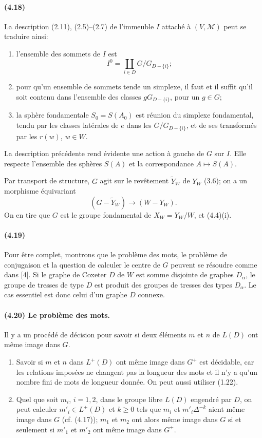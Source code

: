 \documentclass[10pt]{article}
\begin{document}
\paragraph{(4.18)} La description (2.11), (2.5)--(2.7) de l'immeuble \(I\) attaché à \((V,\mathcal M)\) peut se traduire ainsi:
\begin{enumerate}[label=\alph*)]
\item l'ensemble des sommets de \(I\) est
\[
I^0=\coprod_{i\in D}G/G_{D-\{i\}};
\]
\item pour qu'un ensemble de sommets tende un simplexe, il faut et il suffit qu'il soit contenu dans l'ensemble des classes \(gG_{D-\{i\}}\), pour un \(g\in G\);
\item la sphère fondamentale \(S_0=S(A_0)\) est réunion du simplexe fondamental, tendu par les classes latérales de \(e\) dans les \(G/G_{D-\{i\}}\), et de ses transformés par les \(r(w)\), \(w\in W\).
\end{enumerate}
La description précédente rend évidente une action à gauche de \(G\) sur \(I\). Elle respecte l'ensemble des sphères \(S(A)\) et la correspondance \(A\mapsto S(A)\).

Par transport de structure, \(G\) agit sur le revêtement \(\widetilde Y_W\) de \(Y_W\) (3.6); on a un morphisme équivariant
\[
(G-\widetilde Y_W)\longrightarrow (W-Y_W).
\]
On en tire que \(G\) est le groupe fondamental de \(X_W=Y_W/W\), et (4.4)(i).

\paragraph{(4.19)} Pour être complet, montrons que le problème des mots, le problème de conjugaison et la question de calculer le centre de \(G\) peuvent se résoudre comme dans [4]. Si le graphe de Coxeter \(D\) de \(W\) est somme disjointe de graphes \(D_\alpha\), le groupe de tresses de type \(D\) est produit des groupes de tresses des types \(D_\alpha\). Le cas essentiel est donc celui d'un graphe \(D\) connexe.

\paragraph{(4.20) Le problème des mots.} Il y a un procédé de décision pour savoir si deux éléments \(m\) et \(n\) de \(L(D)\) ont même image dans \(G\).
\begin{enumerate}[label=\alph*)]
\item Savoir si \(m\) et \(n\) dans \(L^+(D)\) ont même image dans \(G^+\) est décidable, car les relations imposées ne changent pas la longueur des mots et il n'y a qu'un nombre fini de mots de longueur donnée. On peut aussi utiliser (1.22).
\item Quel que soit \(m_i\), \(i=1,2\), dans le groupe libre \(L(D)\) engendré par \(D\), on peut calculer \(m'_i\in L^+(D)\) et \(k\ge0\) tels que \(m_i\) et \(m'_i\Delta^{-k}\) aient même image dans \(G\) (cf. (4.17)); \(m_1\) et \(m_2\) ont alors même image dans \(G\) si et seulement si \(m'_1\) et \(m'_2\) ont même image dans \(G^+\).
\end{enumerate}
\end{document}
